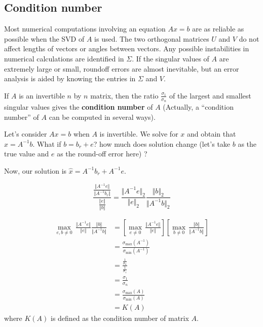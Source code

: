 


\subsection{Condition number}
Most numerical computations involving an equation $Ax = b$ are as reliable as possible when the SVD of $A$ is used. The two
orthogonal matrices $U$ and $V$ do not affect lengths of vectors or angles between vectors. Any possible instabilities in numerical calculations are identified in $\Sigma$. If the singular values of $A$ are extremely large or small, roundoff errors are almost inevitable, but an error analysis is aided by knowing the entries in $\Sigma$ and $V$.

If $A$ is an invertible $n$ by $n$ matrix, then the ratio $\frac{\sigma_1}{\sigma_n}$ of the largest and smallest singular values gives the \textbf{condition number} of $A$ (Actually, a “condition number” of $A$ can be computed in several ways).

Let's consider $Ax = b$ when $A$ is invertible. We solve for $x$ and obtain that $x = A^{-1}b$. What if $b = b_r + e$? how much does solution change (let's take $b$ as the true value and $e$ as the round-off error here) ?

Now, our solution is $\hat{x} = A^{-1}b_r + A^{-1}e$.

\begin{equation*}
\frac{\frac{\Vert A^{-1}e\Vert}{\Vert A^{-1}b_r\Vert}}{\frac{\Vert e\Vert}{\Vert b\Vert}} = \frac{\Vert A^{-1}e\Vert_2}{\Vert e\Vert_2} \frac{\Vert b\Vert_2}{\Vert A^{-1}b\Vert_2}
\end{equation*}

\begin{align*}
\max_{e,b\neq 0} \, \frac{\Vert A^{-1}e\Vert}{\Vert e\Vert} \frac{\Vert b\Vert}{\Vert A^{-1}b\Vert} 
&= \left[\max_{e\neq 0}\, \frac{\Vert A^{-1}e\Vert}{\Vert e\Vert}\right]\left[\max_{b\neq 0}\, \frac{\Vert b\Vert}{\Vert A^{-1}b\Vert}\right]\\
&= \frac{\sigma_{\max}(A^{-1})}{\sigma_{\min}(A^{-1})}\\
&= \frac{\frac{1}{\sigma_n}}{\frac{1}{\sigma_1}}\\
&= \frac{\sigma_1}{\sigma_n}\\
&= \frac{\sigma_{\max}(A)}{\sigma_{\min}(A)}\\
&= K(A)
\end{align*}
where $K(A)$ is defined as the condition number of matrix $A$.

